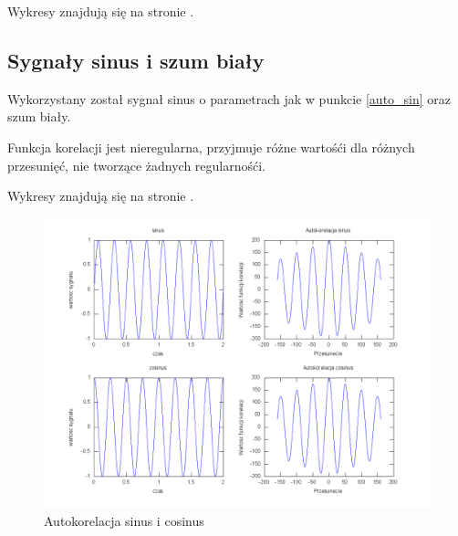\documentclass[wide,a4paper,titlepage,12pt]{mwart}
\begin{document}
		Wykresy znajdują się na stronie \pageref{wykres5}.
		
	 \subsection{Sygnały sinus i szum biały}	
		Wykorzystany został sygnał sinus o parametrach jak w punkcie \ref{auto_sin} oraz szum biały.

		Funkcja korelacji jest nieregularna, przyjmuje różne wartośći dla różnych przesunięć, nie tworzące żadnych regularnośći.

		Wykresy znajdują się na stronie \pageref{wykres5}.
	 	
 
      \begin{landscape}
        \begin{figure}[htbp]
          \begin{center}
            \includegraphics[scale=.5]{out/Figure1.png}
            \caption{\label{wykres1} Autokorelacja sinus i cosinus}
          \end{center}
        \end{figure}
      \end{landscape}
\end{document}
